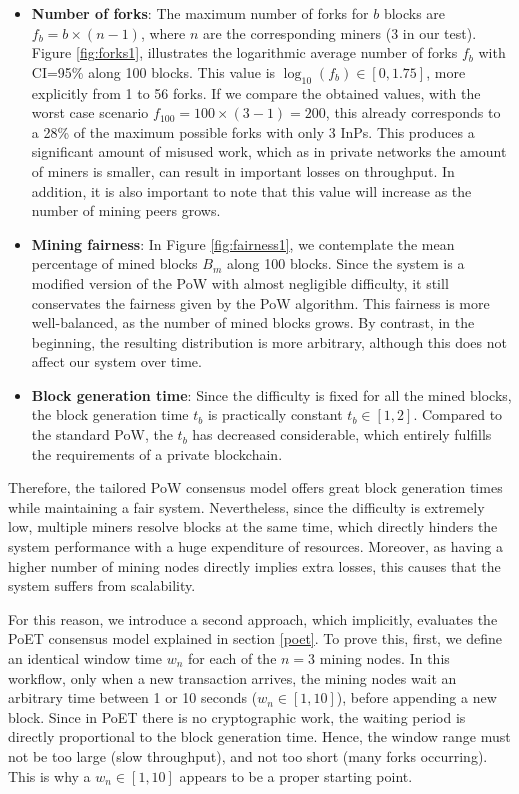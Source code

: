 \begin{itemize}
\item \textbf{Number of forks}: The maximum number of forks for $b$ blocks are $f_b = b \times (n-1)$, where $n$ are the corresponding miners (3 in our test). Figure \ref{fig:forks1}, illustrates the logarithmic average number of forks $f_b$ with CI=95\% along 100 blocks. This value is $\log_{10}(f_b) \in [0,1.75]$, more explicitly from 1 to 56 forks. If we compare the obtained values, with the worst case scenario $f_{100} = 100 \times (3-1) = 200$, this already corresponds to a 28\% of the maximum possible forks with only 3 InPs. This produces a significant amount of misused work, which as in private networks the amount of miners is smaller, can result in important losses on throughput. In addition, it is also important to note that this value will increase as the number of mining peers grows.
\item \textbf{Mining fairness}: In Figure \ref{fig:fairness1}, we contemplate the mean percentage of mined blocks $B_m$ along 100 blocks. Since the system is a modified version of the PoW with almost negligible difficulty, it still conservates the fairness given by the PoW algorithm. This fairness is more well-balanced, as the number of mined blocks grows. By contrast, in the beginning, the resulting distribution is more arbitrary, although this does not affect our system over time.
\item \textbf{Block generation time}: Since the difficulty is fixed for all the mined blocks, the block generation time $t_b$ is practically constant $t_b \in [1,2]$. Compared to the standard PoW, the $t_b$ has decreased considerable, which entirely fulfills the requirements of a private blockchain.
 
\end{itemize}

Therefore, the tailored PoW consensus model offers great block generation times while maintaining a fair system. Nevertheless, since the difficulty is extremely low, multiple miners resolve blocks at the same time, which directly hinders the system performance with a huge expenditure of resources. Moreover, as having a higher number of mining nodes directly implies extra losses, this causes that the system suffers from scalability. 

For this reason, we introduce a second approach, which implicitly, evaluates the PoET consensus model explained in section \ref{poet}. To prove this, first, we define an identical window time $w_n$ for each of the $n = 3$ mining nodes. In this workflow, only when a new transaction arrives, the mining nodes wait an arbitrary time between 1 or 10 seconds ($w_n \in [1,10]$), before appending a new block. Since in PoET there is no cryptographic work, the waiting period is directly proportional to the block generation time. Hence, the window range must not be too large (slow throughput), and not too short (many forks occurring). This is why a $w_n \in [1,10]$ appears to be a proper starting point. 

